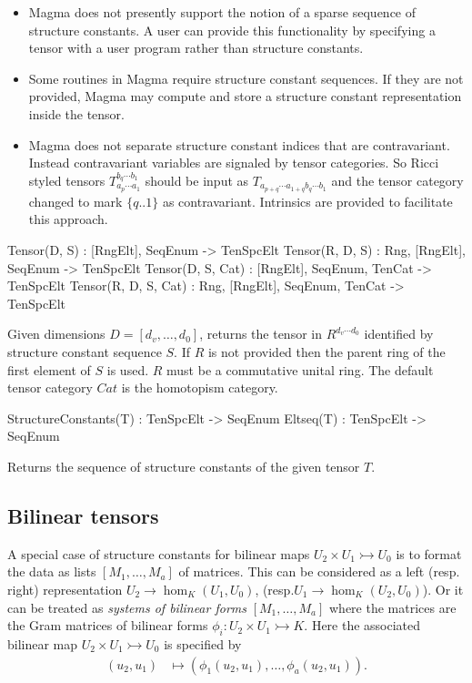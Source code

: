 \begin{itemize}
\item Magma does not presently support the notion of a sparse sequence of structure constants.
A user can provide this functionality by specifying a tensor with a user program rather
than structure constants. 

\item Some routines in Magma require structure constant sequences.  If they 
are not provided, Magma may compute and store a structure constant representation
inside the tensor.

\item Magma does not separate structure constant indices that are contravariant.  Instead contravariant variables are signaled by tensor categories.  So Ricci styled tensors $T_{a_p\cdots a_1}^{b_q\cdots b_1}$ should be input as $T_{a_{p+q}\cdots a_{1+q} b_q\cdots b_1}$ and the tensor
category changed to mark $\{q..1\}$ as contravariant. Intrinsics are provided to facilitate this approach.
\end{itemize}
\medskip

\begin{intrinsics}
Tensor(D, S) : [RngElt], SeqEnum -> TenSpcElt
Tensor(R, D, S) : Rng, [RngElt], SeqEnum -> TenSpcElt
Tensor(D, S, Cat) : [RngElt], SeqEnum, TenCat -> TenSpcElt
Tensor(R, D, S, Cat) : Rng, [RngElt], SeqEnum, TenCat -> TenSpcElt
\end{intrinsics}

Given dimensions $D=[d_v,\dots,d_0]$, returns the tensor
in $R^{d_v\cdots d_0}$ identified by structure constant sequence $S$.
If $R$ is not provided then the parent ring of the first element of $S$ is used.  
$R$ must be a commutative unital ring.
The default tensor category $Cat$ is the homotopism category.

\begin{intrinsics}
StructureConstants(T) : TenSpcElt -> SeqEnum
Eltseq(T) : TenSpcElt -> SeqEnum
\end{intrinsics}

Returns the sequence of structure constants of the given tensor $T$. 


\subsection{Bilinear tensors}
A special case of structure constants for bilinear maps $U_2\times U_1\rightarrowtail U_0$
is to format the data as lists $[M_1,\dots, M_a]$ of matrices.
This can be considered as a left (resp. right) representation
$U_2\to \hom_K(U_1,U_0)$, (resp.$U_1\to \hom_K(U_2,U_0)$).  
Or it can be treated as {\em systems of bilinear forms} 
$[M_1,\dots,M_a]$ where the matrices are the Gram matrices of bilinear forms $\phi_i:U_2\times U_1\rightarrowtail K$.
Here the associated bilinear map $U_2\times U_1\rightarrowtail U_0$ is 
specified by
\begin{align*}
	(u_2,u_1) & \mapsto ( \phi_1(u_2,u_1),\dots, \phi_a(u_2,u_1)).
\end{align*}

